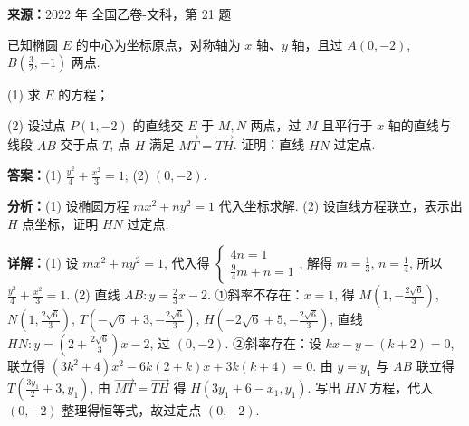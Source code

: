 \begin{question}[points=12]
\textbf{来源：}2022 年 全国乙卷-文科，第 21 题\par
已知椭圆 $E$ 的中心为坐标原点，对称轴为 $x$ 轴、$y$ 轴，且过 $A(0,-2)$, $B(\frac32,-1)$ 两点.

(1) 求 $E$ 的方程；

(2) 设过点 $P(1,-2)$ 的直线交 $E$ 于 $M,N$ 两点，过 $M$ 且平行于 $x$ 轴的直线与线段 $AB$ 交于点 $T$, 点 $H$ 满足 $\overrightarrow{MT} = \overrightarrow{TH}$. 证明：直线 $HN$ 过定点.
\begin{solution}
\textbf{答案：}(1) $\frac{y^2}{4}+\frac{x^2}{3}=1$; (2) $(0,-2)$.

\textbf{分析：}(1) 设椭圆方程 $mx^2+ny^2=1$ 代入坐标求解.
(2) 设直线方程联立，表示出 $H$ 点坐标，证明 $HN$ 过定点.

\textbf{详解：}(1) 设 $mx^2+ny^2=1$, 代入得 $\begin{cases} 4n=1 \\ \frac94 m + n = 1 \end{cases}$, 解得 $m=\frac13$, $n=\frac14$, 所以 $\frac{y^2}{4}+\frac{x^2}{3}=1$.
(2) 直线 $AB: y=\frac23 x -2$. ①斜率不存在：$x=1$, 得 $M(1,-\frac{2\sqrt6}{3})$, $N(1,\frac{2\sqrt6}{3})$, $T(-\sqrt6+3,-\frac{2\sqrt6}{3})$, $H(-2\sqrt6+5,-\frac{2\sqrt6}{3})$, 直线 $HN: y=(2+\frac{2\sqrt6}{3})x-2$, 过 $(0,-2)$. ②斜率存在：设 $kx-y-(k+2)=0$, 联立得 $(3k^2+4)x^2-6k(2+k)x+3k(k+4)=0$. 由 $y=y_1$ 与 $AB$ 联立得 $T(\frac{3y_1}{2}+3, y_1)$, 由 $\overrightarrow{MT}=\overrightarrow{TH}$ 得 $H(3y_1+6-x_1, y_1)$. 写出 $HN$ 方程，代入 $(0,-2)$ 整理得恒等式，故过定点 $(0,-2)$.
\end{solution}
\end{question}

